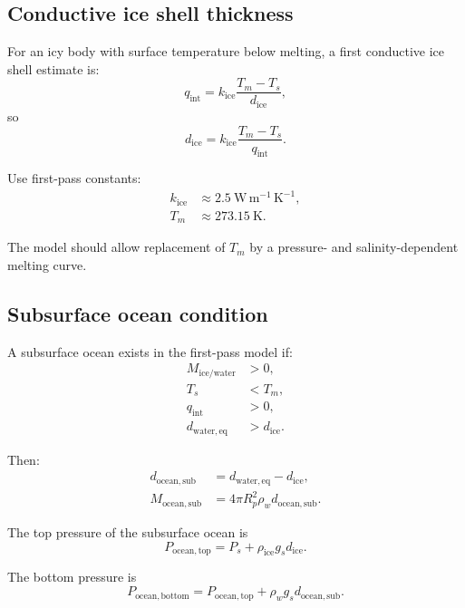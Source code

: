\documentclass[11pt]{article}
\begin{document}
\subsection{Conductive ice shell thickness}

For an icy body with surface temperature below melting, a first conductive ice
shell estimate is:
\begin{equation}
    q_{\mathrm{int}}
    =
    k_{\mathrm{ice}}
    \frac{T_m - T_s}{d_{\mathrm{ice}}},
\end{equation}
so
\begin{equation}
    d_{\mathrm{ice}}
    =
    k_{\mathrm{ice}}
    \frac{T_m - T_s}{q_{\mathrm{int}}}.
\end{equation}

Use first-pass constants:
\begin{align}
    k_{\mathrm{ice}} &\approx 2.5\ \mathrm{W\,m^{-1}\,K^{-1}}, \\
    T_m &\approx 273.15\ \mathrm{K}.
\end{align}

The model should allow replacement of $T_m$ by a pressure- and salinity-dependent
melting curve.

\subsection{Subsurface ocean condition}

A subsurface ocean exists in the first-pass model if:
\begin{align}
    M_{\mathrm{ice/water}} &> 0, \\
    T_s &< T_m, \\
    q_{\mathrm{int}} &> 0, \\
    d_{\mathrm{water,eq}} &> d_{\mathrm{ice}}.
\end{align}

Then:
\begin{align}
    d_{\mathrm{ocean,sub}} &=
    d_{\mathrm{water,eq}} - d_{\mathrm{ice}}, \\
    M_{\mathrm{ocean,sub}} &=
    4\pi R_p^2 \rho_w d_{\mathrm{ocean,sub}}.
\end{align}

The top pressure of the subsurface ocean is
\begin{equation}
    P_{\mathrm{ocean,top}}
    =
    P_s + \rho_{\mathrm{ice}} g_s d_{\mathrm{ice}}.
\end{equation}

The bottom pressure is
\begin{equation}
    P_{\mathrm{ocean,bottom}}
    =
    P_{\mathrm{ocean,top}}
    +
    \rho_w g_s d_{\mathrm{ocean,sub}}.
\end{equation}
\end{document}
